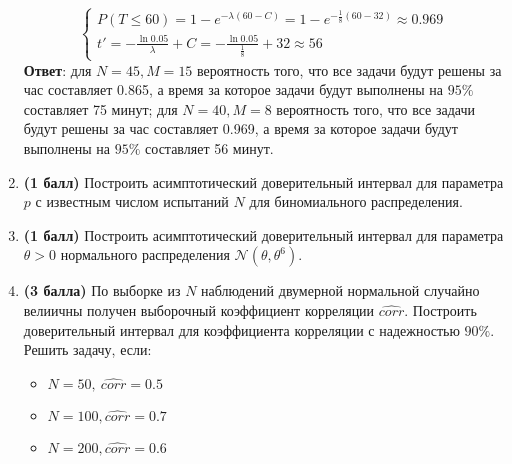 \documentclass{assignment}
\begin{document}
\begin{enumerate}
\begin{equation}
\begin{cases}
            P(T\leq 60)=1 - e^{-\lambda (60-C)} = 1 - e^{-\frac{1}{8} (60-32)} \approx 0.969 \\
            t' = -\frac{\ln 0.05}{\lambda} + C = -\frac{\ln 0.05}{\frac{1}{8}} + 32 \approx 56
        \end{cases}
    \end{equation}
    \textbf{Ответ}: для $N = 45, M = 15$ вероятность того, что все задачи будут решены за час составляет 0.865, а время за которое задачи будут выполнены на $95\%$ составляет 75 минут; для $N = 40, M = 8$ вероятность того, что все задачи будут решены за час составляет 0.969, а время за которое задачи будут выполнены на $95\%$ составляет 56 минут.
    \finish

    \item \textbf{(1 балл)} Построить асимптотический доверительный интервал для параметра $p$ с известным числом испытаний $N$ для биномиального распределения.

    \item \textbf{(1 балл)} Построить асимптотический доверительный интервал для параметра $\theta > 0$ нормального распределения $\mathcal{N}(\theta, \theta^6)$.


    \item \textbf{(3 балла)} По выборке из $N$ наблюдений двумерной нормальной случайно велиичны получен выборочный коэффициент корреляции $\hat{corr}$. Построить доверительный интервал для коэффициента корреляции с надежностью $90\%$. Решить задачу, если: 

    \begin{itemize}
        \item $N = 50,~ \hat{corr} = 0.5$
        \item $N = 100, \hat{corr} = 0.7$
        \item $N = 200, \hat{corr} = 0.6$

    \end{itemize}



\end{enumerate}
\end{document}
